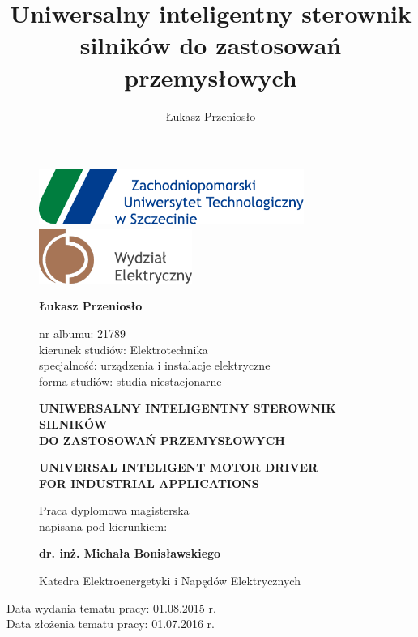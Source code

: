 \documentclass[12pt]{mwart}
\title{Uniwersalny inteligentny sterownik silników do zastosowań przemysłowych}
\author{Łukasz Przeniosło}
\numberwithin{equation}{section}
\newcommand{\paperTitlePl}{UNIWERSALNY INTELIGENTNY STEROWNIK SILNIKÓW \\ DO ZASTOSOWAŃ PRZEMYSŁOWYCH}
\newcommand{\paperTitleEn}{UNIVERSAL INTELIGENT MOTOR DRIVER \\ FOR INDUSTRIAL APPLICATIONS}
\newcommand{\topicChooseDate}{01.08.2015 r.}
\newcommand{\topicAcceptationDate}{01.07.2016 r.}
\begin{document}
\thispagestyle{empty} %

\begin{figure}[h]
	\centering
	\includegraphics[height=18mm]{grafiki/logo_zut.pdf}
	\hspace{5mm}
	\includegraphics[height=18mm]{grafiki/logo_zut_we.pdf} \\
	\vspace{20mm}


	{\bf \large Łukasz Przeniosło} \\ 
	\vspace{5mm}

	nr albumu: 21789 \\
	kierunek studiów: Elektrotechnika \\
	specjalność: urządzenia i instalacje elektryczne \\
	forma studiów: studia niestacjonarne \\
	\vspace{20mm}

	\textsc{\textbf{\large \paperTitlePl{}}} \\
	\vspace{5mm}

	\textsc{\textbf{\large \paperTitleEn{}}} \\
	\vspace{45mm}
	
	Praca dyplomowa magisterska \\
	napisana pod kierunkiem: \\
	\vspace{2mm}
	
	{\bf \large dr. inż. Michała Bonisławskiego} \\
	\vspace{2mm}
	
	Katedra Elektroenergetyki i Napędów Elektrycznych
	\vspace{5mm}
	
\end{figure}

\begin{flushleft}
	{\footnotesize Data wydania tematu pracy: \topicChooseDate} \\
	{\footnotesize Data złożenia tematu pracy: \topicAcceptationDate} 
\end{flushleft}
\end{document}

